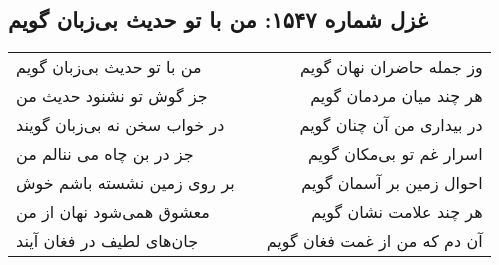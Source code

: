\begin{center}
\section*{غزل شماره ۱۵۴۷: من با تو حدیث بی‌زبان گویم}
\label{sec:1547}
\begin{longtable}{l p{0.5cm} r}
من با تو حدیث بی‌زبان گویم
&&
وز جمله حاضران نهان گویم
\\
جز گوش تو نشنود حدیث من
&&
هر چند میان مردمان گویم
\\
در خواب سخن نه بی‌زبان گویند
&&
در بیداری من آن چنان گویم
\\
جز در بن چاه می ننالم من
&&
اسرار غم تو بی‌مکان گویم
\\
بر روی زمین نشسته باشم خوش
&&
احوال زمین بر آسمان گویم
\\
معشوق همی‌شود نهان از من
&&
هر چند علامت نشان گویم
\\
جان‌های لطیف در فغان آیند
&&
آن دم که من از غمت فغان گویم
\\
\end{longtable}
\end{center}
